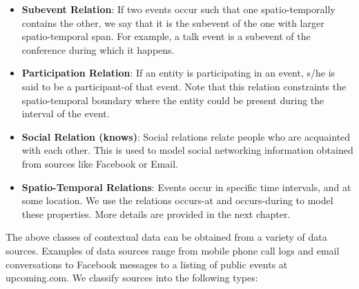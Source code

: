 \begin{itemize}
\item \textbf{Subevent Relation}: If two events occur such that one spatio-temporally contains the other, we say that it is the subevent \cite{gupta2011managing} of the one with larger spatio-temporal span. For example, a talk event is a subevent of the conference during which it happens.

\item \textbf{Participation Relation}: If an entity is participating in an event, s/he is said to be a participant-of that event. Note that this relation constraints the spatio-temporal boundary where the entity could be present during the interval of the event.

\item \textbf{Social Relation (knows)}: Social relations relate people who are acquainted with each other. This is used to model social networking information obtained from sources like Facebook or Email.

\item \textbf{Spatio-Temporal Relations}: Events occur in specific time intervals, and at some location. We use the relations occurs-at and occurs-during to model these properties. More details are provided in the next chapter.
\end{itemize}

The above classes of contextual data can be obtained from a variety of data sources. Examples of data sources range from mobile phone call logs and email conversations to Facebook messages to a listing of public events at upcoming.com. We classify sources into the following types:


